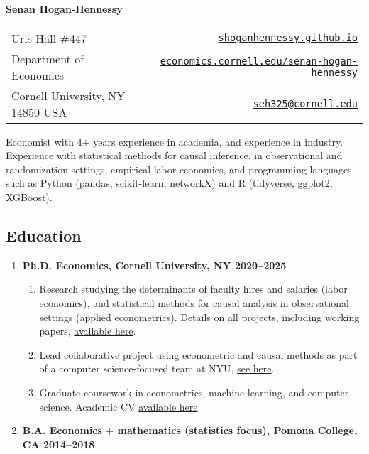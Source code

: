 \documentclass[letterpaper,11pt,oneside]{article}
\begin{document}
\centerline{\LARGE{\textbf{Senan Hogan-Hennessy}}}
\vspace{0.1cm}
\begin{table}[H]
    \centering
    \begin{tabular*}{\textwidth}{l @{\extracolsep{\fill}} r}
        \toprule
        Uris Hall \#447 &
            \href{https://shoganhennessy.github.io}{
                \nolinkurl{shoganhennessy.github.io}} \\
        Department of Economics &
            \href{https://economics.cornell.edu/senan-hogan-hennessy}{
                \nolinkurl{economics.cornell.edu/senan-hogan-hennessy}} \\
        Cornell University, NY 14850 USA &
            \href{mailto:seh325@cornell.edu}{\nolinkurl{seh325@cornell.edu}} \\
        \bottomrule
    \end{tabular*}
\end{table}

Economist with 4$+$ years experience in academia, and experience in industry.
Experience with statistical methods for causal inference, in observational and randomization settings, empirical labor economics, and programming languages such as Python (pandas, scikit-learn, networkX) and R (tidyverse, ggplot2, XGBoost). 

\subsection*{Education}
\begin{enumerate}[itemsep=2.5pt, label={}, leftmargin=0pt]
    \item \textbf{Ph.D. Economics, Cornell University, NY \hfill 2020--2025}%
    \begin{enumerate}[itemsep=0pt, label={\textbf{--}}, leftmargin=12pt]
        \item Research studying the determinants of faculty hires and salaries (labor economics), and statistical methods for causal analysis in observational settings (applied econometrics).
        Details on all projects, including working papers, \href{https://shoganhennessy.github.io/research/}{available here}.

        \item Lead collaborative project using econometric and causal methods as part of a computer science-focused team at NYU, \href{https://doi.org/10.48550/arXiv.2210.07970}{see here}.
        
        \item Graduate coursework in econometrics, machine learning, and computer science.
        Academic CV \href{https://shoganhennessy.github.io/files/cv/cv-shoganhennessy.pdf}{available here}.
\end{enumerate}
    
    \item \textbf{B.A. Economics $+$ mathematics (statistics focus), Pomona College, CA \hfill 2014--2018}
\end{enumerate}
\end{document}
